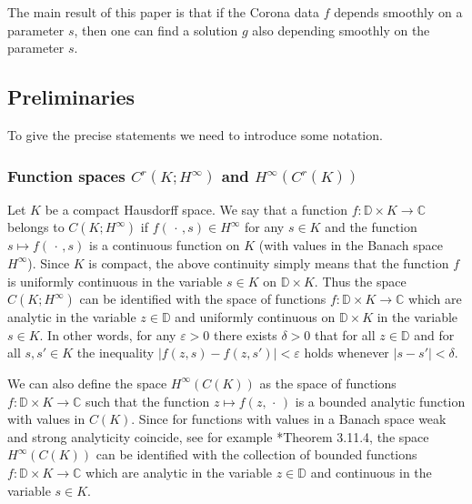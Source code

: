 \documentclass[12pt]{amsart}
\begin{document}
{\begin{list}{X}
{The main result of this paper is that if the Corona data $f$ depends smoothly on a parameter $s$, then one can find a solution $g$ also depending smoothly on the parameter $s$. 

\subsection{Preliminaries} 
To give the precise statements we  need to introduce some notation. 
\label{s:prelim}
\subsubsection{Function spaces \(C^r\left(K;H^\infty\right) \) and \(H^\infty\left(C^r(K)\right)\)}
Let $K$ be a compact Hausdorff space. We say that a function $f:{\mathbb{D}}\times K\to {\mathbb{C}}$ belongs to $C\left(K;H^\infty\right)$ if $f({\,\cdot\,} , s)\in H^\infty$ for any $s\in K$ and the function $s\mapsto f ({\,\cdot\,}, s)$ is a continuous function on $K$ (with values in the Banach space $H^\infty$). Since $K$ is compact, the above continuity simply means that the function $f$ is uniformly continuous in the variable $s\in K$ on ${\mathbb{D}}\times K$. Thus the space $C\left(K;H^\infty\right)$ can be identified with the space of functions $f:{\mathbb{D}}\times K\to {\mathbb{C}}$ which are analytic in the variable $z\in{\mathbb{D}}$ and uniformly continuous on ${\mathbb{D}}\times K$ in the variable $s\in K$.  In other words, for any ${\varepsilon}>0$ there exists $\delta>0$ that for all $z\in {\mathbb{D}}$ and for all $s, s'\in K$ the inequality $|f(z, s)-f(z, s')|<{\varepsilon}$ holds whenever $|s-s'|<\delta$. 

We can also define the space $H^\infty\left(C(K)\right)$ as the space of functions $f:{\mathbb{D}}\times K\to {\mathbb{C}}$ such that the function $z\mapsto f(z, {\,\cdot\,})$ is a bounded analytic function with values in $C(K)$. Since for functions with values in a Banach space weak and strong analyticity coincide, see  for example \cite{Nik-book-v1}*{Theorem 3.11.4}, the space $H^\infty\left(C(K)\right)$ can be identified with the collection of bounded functions $f:{\mathbb{D}}\times K\to {\mathbb{C}}$ which are analytic in the variable $z\in {\mathbb{D}}$ and continuous in the variable $s\in K$. 

}
\end{list}}
\end{document}
